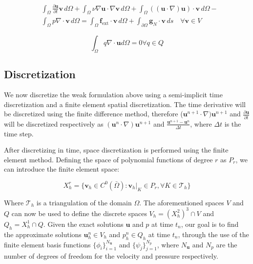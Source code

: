\begin{equation}
    \begin{split}
        & \int_{\Omega} \frac{\partial \mathbf{u}}{\partial t} \mathbf{v} \, d\Omega + \int_{\Omega} \nu \nabla \mathbf{u} \cdot \nabla \mathbf{v} \, d\Omega + \int_{\Omega} ((\mathbf{u} \cdot \nabla) \mathbf{u}) \cdot \mathbf{v} \, d\Omega - \\
        & \int_{\Omega} p \nabla \cdot \mathbf{v} \, d\Omega = \int_{\Omega} \mathbf{f}_{\text{ext}} \cdot \mathbf{v} \, d\Omega + \int_{\partial \Omega} \mathbf{g}_N \cdot \mathbf{v} \, ds \quad \forall \mathbf{v} \in V
    \end{split}
\end{equation}
    
\begin{equation}
    \int_{\Omega} q \nabla \cdot \mathbf{u} d \Omega = 0 \forall q \in Q
\end{equation}

\subsection{Discretization}
We now discretize the weak formulation above using a semi-implicit time discretization and a finite element spatial discretization. The time derivative will be discretized using the finite difference method, therefore ($\mathbf{u}^{n+1} \cdot \nabla) \mathbf{u}^{n+1}$ and $\frac{\partial \mathbf{u}}{\partial t}$ will be discretized respectively as $(\mathbf{u}^n \cdot \nabla) \mathbf{u}^{n+1}$ and $\frac{\mathbf{u}^{n+1} - \mathbf{u}^n}{\Delta t}$, where $\Delta t$ is the time step.

After discretizing in time, space discretization is performed using the finite element method. Defining the space of polynomial functions of degree $r$ as $P_r$, we can introduce the finite element space:

\begin{equation}
    X_h^r = \{\mathbf{v}_h \in C^0(\bar\Omega) : \mathbf{v}_h|_K \in P_r, \forall K \in \mathcal{T}_h\}
\end{equation}

Where $\mathcal{T}_h$ is a triangulation of the domain $\Omega$. The aforementioned spaces $V$ and $Q$ can now be used to define the discrete spaces $V_h = (X_h^2)^3 \cap V$ and $Q_h = X_h^1 \cap Q$.
Given the exact solutions $\mathbf{u}$ and $p$ at time $t_n$, our goal is to find the approximate solutions $\mathbf{u}^n_h \in V_h$ and $p^n_h \in Q_h$ at time $t_n$, through the use of the finite element basis functions $\{\phi_i\}_{i=1}^{N_{\mathbf{u}}}$ and $\{\psi_j\}_{j=1}^{N_p}$, where $N_{\mathbf{u}}$ and $N_p$ are the number of degrees of freedom for the velocity and pressure respectively.

